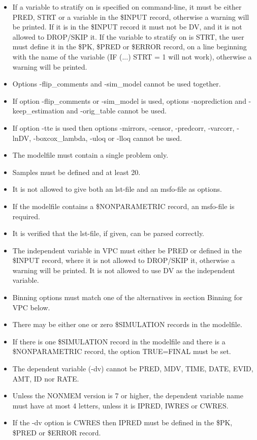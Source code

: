 \begin{itemize}
	\item If a variable to stratify on is specified on command-line, it must be either PRED, STRT or a variable in the \$INPUT record, otherwise a warning will be printed. If it is in the \$INPUT record it must not be DV, and it is not allowed to DROP/SKIP it. If the variable to stratify on is STRT, the user must define it in the \$PK, \$PRED or \$ERROR record, on a line beginning with the name of the variable (IF (...) STRT = 1 will not work), otherwise a warning will be printed.
	\item Options -flip\_comments and -sim\_model cannot be used together.
	\item If option -flip\_comments or -sim\_model is used, options -noprediction and -keep\_estimation and -orig\_table cannot be used.
	\item If option -tte is used then options -mirrors, -censor, -predcorr, -varcorr, -lnDV, -boxcox\_lambda, -uloq or -lloq cannot be used.   
	\item The modelfile must contain a single problem only.
	\item Samples must be defined and at least 20.
	\item It is not allowed to give both an lst-file and an msfo-file as options.
	\item If the modelfile contains a \$NONPARAMETRIC record, an msfo-file is required.
	\item It is verified that the lst-file, if given, can be parsed correctly.
	\item The independent variable in VPC must either be PRED or defined in the \$INPUT record, where it is not allowed to DROP/SKIP it, otherwise a warning will be printed. It is not allowed to use DV as the independent variable.
	\item Binning options must match one of the alternatives in section Binning for VPC below.
	\item There may be either one or zero \$SIMULATION records in the modelfile. 
	\item If there is one \$SIMULATION record in the modelfile and there is a \$NONPARAMETRIC record, the option TRUE=FINAL must be set.
	\item The dependent variable (-dv) cannot be PRED, MDV, TIME, DATE, EVID, AMT, ID nor RATE.
	\item Unless the NONMEM version is 7 or higher, the dependent variable name must have at most 4 letters, unless it is IPRED, IWRES or CWRES.
	\item If the -dv option is CWRES then IPRED must be defined in the \$PK, \$PRED or \$ERROR record.

\end{itemize}
